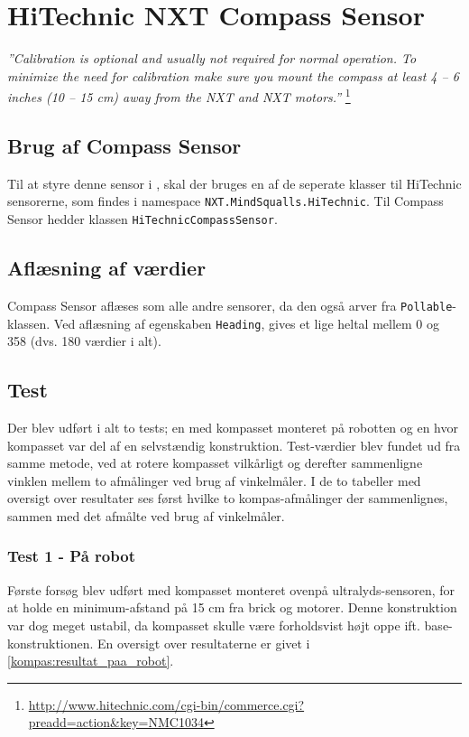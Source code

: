 \section{HiTechnic NXT Compass Sensor}
\textit{''Calibration is optional and usually not required for normal operation. To minimize the need for calibration make sure you mount the compass at least 4 – 6 inches (10 – 15 cm) away from the NXT and NXT motors.''}
\footnote{\url{http://www.hitechnic.com/cgi-bin/commerce.cgi?preadd=action&key=NMC1034}}

\subsection{Brug af Compass Sensor}
Til at styre denne sensor i \mindsqualls, skal der bruges en af de seperate klasser til HiTechnic sensorerne, som findes i namespace \lstinline[style=csharp]!NXT.MindSqualls.HiTechnic!.
Til Compass Sensor hedder klassen \lstinline[style=csharp]!HiTechnicCompassSensor!.

\subsection{Aflæsning af værdier}
Compass Sensor aflæses som alle andre sensorer, da den også arver fra \lstinline[style=csharp]!Pollable!-klassen.
Ved aflæsning af egenskaben \lstinline[style=csharp]!Heading!, gives et lige heltal mellem 0 og 358 (dvs. 180 værdier i alt).

\subsection{Test}
Der blev udført i alt to tests; en med kompasset monteret på robotten og en hvor kompasset var del af en selvstændig konstruktion.
Test-værdier blev fundet ud fra samme metode, ved at rotere kompasset vilkårligt og derefter sammenligne vinklen mellem to afmålinger ved brug af vinkelmåler.
I de to tabeller med oversigt over resultater ses først hvilke to kompas-afmålinger der sammenlignes, sammen med det afmålte ved brug af vinkelmåler.

\subsubsection{Test 1 - På robot}
Første forsøg blev udført med kompasset monteret ovenpå ultralyds-sensoren, for at holde en minimum-afstand på 15 cm fra brick og motorer.
Denne konstruktion var dog meget ustabil, da kompasset skulle være forholdsvist højt oppe ift. base-konstruktionen.
En oversigt over resultaterne er givet i \cref{kompas:resultat_paa_robot}.

